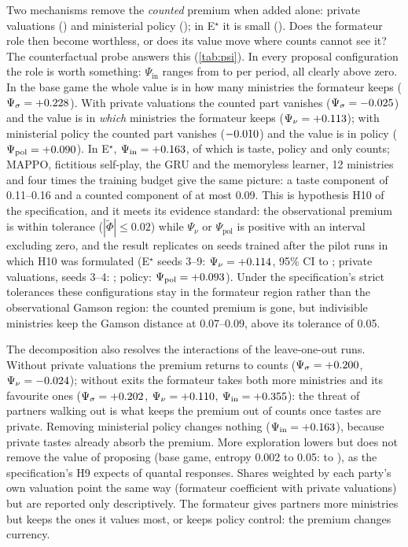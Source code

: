 \documentclass[11pt,a4paper]{article}
\begin{document}
Two mechanisms remove the \emph{counted} premium when added alone: private valuations (\MfourGamma) and
ministerial policy (\MnineGamma); in E$^\star$ it is small (\EstarGamma). Does the formateur role then
become worthless, or does its value move where counts cannot see it? The counterfactual probe answers this
(\cref{tab:psi}). In every proposal configuration the role is worth something: $\Psi_{\mathrm{in}}$ ranges
from \PsiMnine{} to \PsiAfProp{} per period, all clearly above zero. In the base game the whole value is in
how many ministries the formateur keeps ($\Psi_\sigma=+0.228$). With private valuations the counted
part vanishes ($\Psi_\sigma=-0.025$) and the value is in \emph{which} ministries the formateur keeps
($\Psi_\nu=+0.113$); with ministerial policy the counted part vanishes ($-0.010$) and the value
is in policy ($\Psi_{\mathrm{pol}}=+0.090$). In E$^\star$, $\Psi_{\mathrm{in}}=+0.163$, of which
\PsiEstarNu{} is taste, \PsiEstarPol{} policy and only \PsiEstarSig{} counts; MAPPO, fictitious self-play, the GRU and the memoryless learner, 12 ministries and four times the
training budget give the same picture: a taste component of 0.11--0.16 and a counted component of at most
0.09. This is hypothesis H10 of the specification, and it meets its evidence standard: the
observational premium is within tolerance ($|\tilde\Phi|\le0.02$) while $\Psi_\nu$ or $\Psi_{\mathrm{pol}}$ is
positive with an interval excluding zero, and the result replicates on seeds trained after the pilot runs
in which H10 was formulated (E$^\star$ seeds 3--9: $\Psi_\nu=+0.114$, 95\% CI
\RepEstarNuLo{} to \RepEstarNuHi; private valuations, seeds 3--4: \RepMfourNu; policy: $\Psi_{\mathrm{pol}}=
+0.093$). Under the specification's strict tolerances these configurations stay in the formateur
region rather than the observational Gamson region: the counted premium is gone, but indivisible
ministries keep the Gamson distance at 0.07--0.09, above its tolerance of 0.05.

The decomposition also resolves the interactions of the leave-one-out runs. Without private valuations the
premium returns to counts ($\Psi_\sigma=+0.200$, $\Psi_\nu=-0.024$); without exits the
formateur takes both more ministries and its favourite ones ($\Psi_\sigma=+0.202$,
$\Psi_\nu=+0.110$, $\Psi_{\mathrm{in}}=+0.355$): the threat of partners walking out is what
keeps the premium out of counts once tastes are private. Removing ministerial policy changes nothing
($\Psi_{\mathrm{in}}=+0.163$), because private tastes already absorb the premium. More exploration
lowers but does not remove the value of proposing (base game, entropy 0.002 to 0.05: \PsiEntLo{} to
\PsiEntHi), as the specification's H9 expects of quantal responses. Shares weighted by each party's own
valuation point the same way (formateur coefficient \MfourGnu{} with private valuations) but are reported
only descriptively. The formateur gives partners more ministries but keeps the ones it values most, or
keeps policy control: the premium changes currency.
\end{document}
